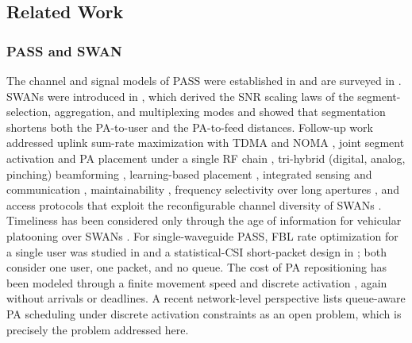 \documentclass[journal]{IEEEtran}
\begin{document}
\subsection{Related Work}
\subsubsection{PASS and SWAN}
The channel and signal models of PASS were established in \cite{Ding2025FlexibleAntenna} and are surveyed in \cite{Liu2026PASSTutorial,Liu2026PASSSurvey,Xu2025GeneralizedPASS}. SWANs were introduced in \cite{Ouyang2026SWAN}, which derived the SNR scaling laws of the segment-selection, aggregation, and multiplexing modes and showed that segmentation shortens both the PA-to-user and the PA-to-feed distances. Follow-up work addressed uplink sum-rate maximization with TDMA and NOMA \cite{Gu2026SWANSumRate}, joint segment activation and PA placement under a single RF chain \cite{Gu2026HSSA}, tri-hybrid (digital, analog, pinching) beamforming \cite{Jiang2026SWANTriHybrid}, learning-based placement \cite{Guo2026SWANGNN}, integrated sensing and communication \cite{Jiang2025SWANISAC,Gao2026SWANISAC,Geng2026CRLBSWAN}, maintainability \cite{Ouyang2026Maintainability}, frequency selectivity over long apertures \cite{Ouyang2026FSPASS}, and access protocols that exploit the reconfigurable channel diversity of SWANs \cite{Shan2026SWANAccess}. Timeliness has been considered only through the age of information for vehicular platooning over SWANs \cite{Zheng2026SWANPlatoon}. For single-waveguide PASS, FBL rate optimization for a single user was studied in \cite{Lin2025URLLCPASS} and a statistical-CSI short-packet design in \cite{Pan2026ShortPacketPASS}; both consider one user, one packet, and no queue. The cost of PA repositioning has been modeled through a finite movement speed \cite{Wang2026Roaming,Wang2026FiniteSpeedPA} and discrete activation \cite{Jiang2026DiscreteCoupling}, again without arrivals or deadlines. A recent network-level perspective \cite{Xu2026NetworkPerspective} lists queue-aware PA scheduling under discrete activation constraints as an open problem, which is precisely the problem addressed here.
\end{document}
